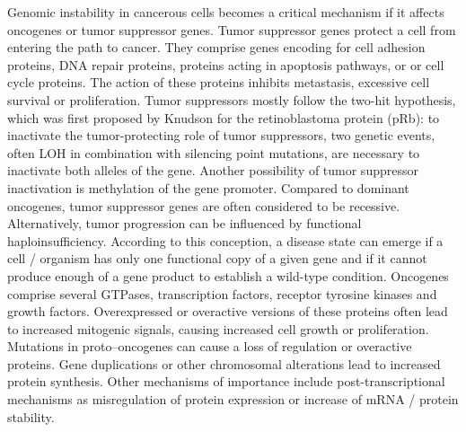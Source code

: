     Genomic instability in cancerous cells becomes a critical mechanism if it
    affects oncogenes or tumor suppressor genes. Tumor suppressor genes protect
    a cell from entering the path to cancer. They comprise
    genes encoding for cell adhesion proteins,  DNA repair proteins, proteins
    acting in apoptosis pathways, or or cell cycle proteins. The action of these
    proteins inhibits metastasis, excessive cell survival or proliferation. Tumor
    suppressors mostly follow the two-hit hypothesis, which was first proposed
    by Knudson  for the retinoblastoma protein (pRb): to inactivate the
    tumor-protecting role of tumor suppressors, two genetic events,
    often LOH in  combination with silencing point mutations, are necessary to
    inactivate both alleles of the gene. Another possibility of tumor
    suppressor inactivation is methylation of the gene promoter. Compared to
    dominant oncogenes, tumor suppressor genes are often considered to be
    recessive. Alternatively, tumor progression can be influenced by functional
    haploinsufficiency. According to this conception, a disease state can emerge
    if a cell / organism has only one functional  copy of a given gene and if it
    cannot  produce enough of a gene product to establish a wild-type condition.
    Oncogenes comprise several GTPases, transcription factors, receptor tyrosine
    kinases and growth factors. Overexpressed or overactive versions of these
    proteins often lead to increased mitogenic signals, causing increased
    cell growth or proliferation. Mutations in proto--oncogenes can cause a
    loss of regulation or overactive proteins. Gene duplications or other
    chromosomal alterations lead to increased protein synthesis. Other
    mechanisms of importance include post-transcriptional mechanisms as
    misregulation of protein expression or increase of mRNA / protein stability.

